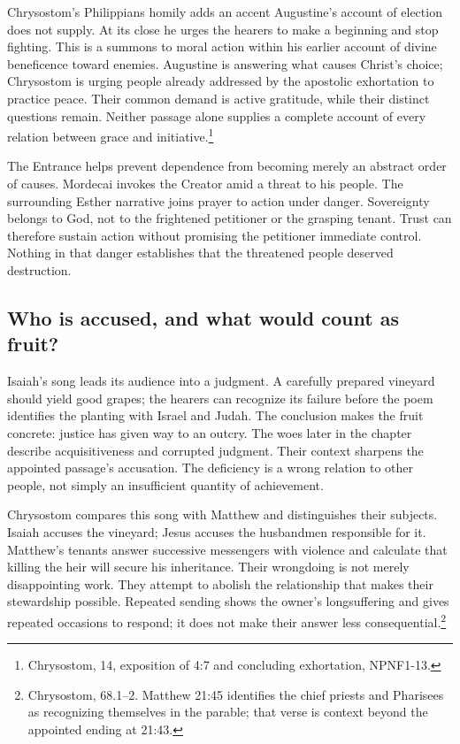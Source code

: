 Chrysostom's Philippians homily adds an accent Augustine's account of election does not supply. At its close he urges the hearers to make a beginning and stop fighting. This is a summons to moral action within his earlier account of divine beneficence toward enemies. Augustine is answering what causes Christ's choice; Chrysostom is urging people already addressed by the apostolic exhortation to practice peace. Their common demand is active gratitude, while their distinct questions remain. Neither passage alone supplies a complete account of every relation between grace and initiative.\footnote{Chrysostom,  14, exposition of 4:7 and concluding exhortation, NPNF1-13.}

The Entrance helps prevent dependence from becoming merely an abstract order of causes. Mordecai invokes the Creator amid a threat to his people. The surrounding Esther narrative joins prayer to action under danger. Sovereignty belongs to God, not to the frightened petitioner or the grasping tenant. Trust can therefore sustain action without promising the petitioner immediate control. Nothing in that danger establishes that the threatened people deserved destruction.

\subsection{Who is accused, and what would count as fruit?}
Isaiah's song leads its audience into a judgment. A carefully prepared vineyard should yield good grapes; the hearers can recognize its failure before the poem identifies the planting with Israel and Judah. The conclusion makes the fruit concrete: justice has given way to an outcry. The woes later in the chapter describe acquisitiveness and corrupted judgment. Their context sharpens the appointed passage's accusation. The deficiency is a wrong relation to other people, not simply an insufficient quantity of achievement.

Chrysostom compares this song with Matthew and distinguishes their subjects. Isaiah accuses the vineyard; Jesus accuses the husbandmen responsible for it. Matthew's tenants answer successive messengers with violence and calculate that killing the heir will secure his inheritance. Their wrongdoing is not merely disappointing work. They attempt to abolish the relationship that makes their stewardship possible. Repeated sending shows the owner's longsuffering and gives repeated occasions to respond; it does not make their answer less consequential.\footnote{Chrysostom,  68.1--2. Matthew 21:45 identifies the chief priests and Pharisees as recognizing themselves in the parable; that verse is context beyond the appointed ending at 21:43.}

